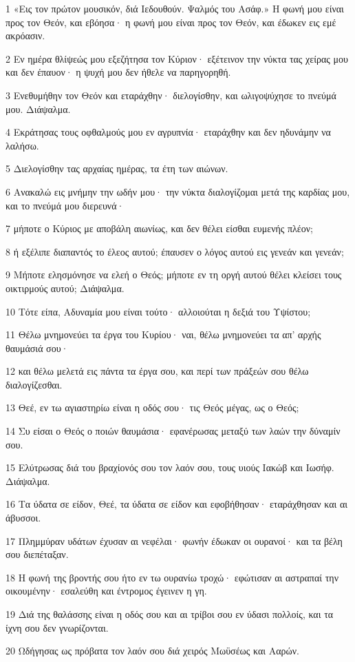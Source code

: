 \par 1 «Εις τον πρώτον μουσικόν, διά Ιεδουθούν. Ψαλμός του Ασάφ.» Η φωνή μου είναι προς τον Θεόν, και εβόησα· η φωνή μου είναι προς τον Θεόν, και έδωκεν εις εμέ ακρόασιν.
\par 2 Εν ημέρα θλίψεώς μου εξεζήτησα τον Κύριον· εξέτεινον την νύκτα τας χείρας μου και δεν έπαυον· η ψυχή μου δεν ήθελε να παρηγορηθή.
\par 3 Ενεθυμήθην τον Θεόν και εταράχθην· διελογίσθην, και ωλιγοψύχησε το πνεύμά μου. Διάψαλμα.
\par 4 Εκράτησας τους οφθαλμούς μου εν αγρυπνία· εταράχθην και δεν ηδυνάμην να λαλήσω.
\par 5 Διελογίσθην τας αρχαίας ημέρας, τα έτη των αιώνων.
\par 6 Ανακαλώ εις μνήμην την ωδήν μου· την νύκτα διαλογίζομαι μετά της καρδίας μου, και το πνεύμά μου διερευνά·
\par 7 μήποτε ο Κύριος με αποβάλη αιωνίως, και δεν θέλει είσθαι ευμενής πλέον;
\par 8 ή εξέλιπε διαπαντός το έλεος αυτού; έπαυσεν ο λόγος αυτού εις γενεάν και γενεάν;
\par 9 Μήποτε ελησμόνησε να ελεή ο Θεός; μήποτε εν τη οργή αυτού θέλει κλείσει τους οικτιρμούς αυτού; Διάψαλμα.
\par 10 Τότε είπα, Αδυναμία μου είναι τούτο· αλλοιούται η δεξιά του Υψίστου;
\par 11 Θέλω μνημονεύει τα έργα του Κυρίου· ναι, θέλω μνημονεύει τα απ' αρχής θαυμάσιά σου·
\par 12 και θέλω μελετά εις πάντα τα έργα σου, και περί των πράξεών σου θέλω διαλογίζεσθαι.
\par 13 Θεέ, εν τω αγιαστηρίω είναι η οδός σου· τις Θεός μέγας, ως ο Θεός;
\par 14 Συ είσαι ο Θεός ο ποιών θαυμάσια· εφανέρωσας μεταξύ των λαών την δύναμίν σου.
\par 15 Ελύτρωσας διά του βραχίονός σου τον λαόν σου, τους υιούς Ιακώβ και Ιωσήφ. Διάψαλμα.
\par 16 Τα ύδατα σε είδον, Θεέ, τα ύδατα σε είδον και εφοβήθησαν· εταράχθησαν και αι άβυσσοι.
\par 17 Πλημμύραν υδάτων έχυσαν αι νεφέλαι· φωνήν έδωκαν οι ουρανοί· και τα βέλη σου διεπέταξαν.
\par 18 Η φωνή της βροντής σου ήτο εν τω ουρανίω τροχώ· εφώτισαν αι αστραπαί την οικουμένην· εσαλεύθη και έντρομος έγεινεν η γη.
\par 19 Διά της θαλάσσης είναι η οδός σου και αι τρίβοι σου εν ύδασι πολλοίς, και τα ίχνη σου δεν γνωρίζονται.
\par 20 Ωδήγησας ως πρόβατα τον λαόν σου διά χειρός Μωϋσέως και Ααρών.

